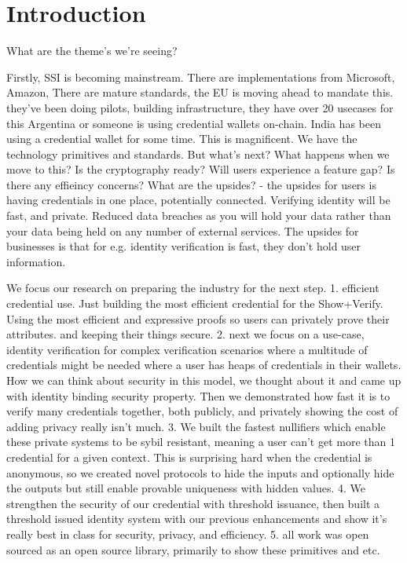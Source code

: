 \chapter{Introduction}


What are the theme's we're seeing? 

Firstly, SSI is becoming mainstream. There are implementations from Microsoft, Amazon, 
There are mature standards, the EU is moving ahead to mandate this. they've been doing pilots, building infrastructure, they have over 20 usecases for this
Argentina or someone is using credential wallets on-chain. India has been using a credential wallet for some time. 
This is magnificent. We have the technology primitives and standards.
But what's next? What happens when we move to this? 
Is the cryptography ready? 
Will users experience a feature gap? Is there any effieincy concerns? 
What are the upsides? - the upsides for users is having credentials in one place, potentially connected. Verifying identity will be fast, and private. Reduced data breaches as you will hold your data rather than your data being held on any number of external services. The upsides for businesses is that for e.g. identity verification is fast, they don't hold user information. 

We focus our research on preparing the industry for the next step.
1. efficient credential use. Just building the most efficient credential for the Show+Verify. Using the most efficient and expressive proofs so users can privately prove their attributes. and keeping their things secure.
2. next we focus on a use-case, identity verification for complex verification scenarios where a multitude of credentials might be needed where a user has heaps of credentials in their wallets. How we can think about security in this model, we thought about it and came up with identity binding security property. Then we demonstrated how fast it is to verify many credentials together, both publicly, and privately showing the cost of adding privacy really isn't much. 
3. We built the fastest nullifiers which enable these private systems to be sybil resistant, meaning a user can't get more than 1 credential for a given context. This is surprising hard when the credential is anonymous, so we created novel protocols to hide the inputs and optionally hide the outputs but still enable provable uniqueness with hidden values.
4. We strengthen the security of our credential with threshold issuance, then built a threshold issued identity system with our previous enhancements and show it's really best in class for security, privacy, and efficiency. 
5. all work was open sourced as an open source library, primarily to show these primitives and etc. 


